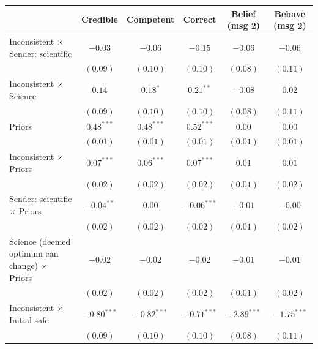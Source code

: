 
\begin{table}
\begin{center}
\begin{tabular}{l c c c c c}
\hline
 & Credible & Competent & Correct & Belief (msg 2) & Behave (msg 2) \\
\hline
Inconsistent $\times$ Sender: scientific            & $-0.03$       & $-0.06$       & $-0.15$       & $-0.06$       & $-0.06$       \\
                                                    & $(0.09)$      & $(0.10)$      & $(0.10)$      & $(0.08)$      & $(0.11)$      \\
Inconsistent $\times$ Science                       & $0.14$        & $0.18^{*}$    & $0.21^{**}$   & $-0.08$       & $0.02$        \\
                                                    & $(0.09)$      & $(0.10)$      & $(0.10)$      & $(0.08)$      & $(0.11)$      \\
Priors                                              & $0.48^{***}$  & $0.48^{***}$  & $0.52^{***}$  & $0.00$        & $0.00$        \\
                                                    & $(0.01)$      & $(0.01)$      & $(0.01)$      & $(0.01)$      & $(0.01)$      \\
Inconsistent $\times$ Priors                        & $0.07^{***}$  & $0.06^{***}$  & $0.07^{***}$  & $0.01$        & $0.01$        \\
                                                    & $(0.02)$      & $(0.02)$      & $(0.02)$      & $(0.01)$      & $(0.02)$      \\
Sender: scientific $\times$ Priors                  & $-0.04^{**}$  & $0.00$        & $-0.06^{***}$ & $-0.01$       & $-0.00$       \\
                                                    & $(0.02)$      & $(0.02)$      & $(0.02)$      & $(0.01)$      & $(0.02)$      \\
Science (deemed optimum can change) $\times$ Priors & $-0.02$       & $-0.02$       & $-0.02$       & $-0.01$       & $-0.01$       \\
                                                    & $(0.02)$      & $(0.02)$      & $(0.02)$      & $(0.01)$      & $(0.02)$      \\
Inconsistent $\times$ Initial safe                  & $-0.80^{***}$ & $-0.82^{***}$ & $-0.71^{***}$ & $-2.89^{***}$ & $-1.75^{***}$ \\
                                                    & $(0.09)$      & $(0.10)$      & $(0.10)$      & $(0.08)$      & $(0.11)$      \\

\end{tabular}
\end{center}
\end{table}
